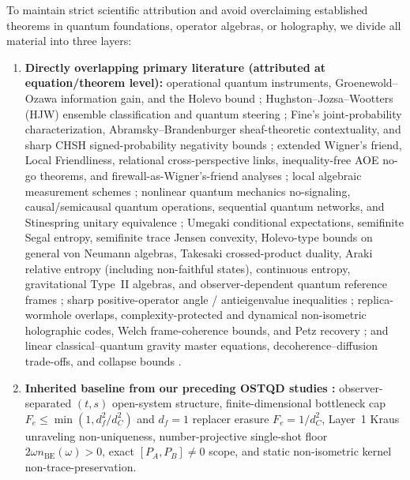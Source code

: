 \documentclass[11pt,a4paper]{article}
\theoremstyle{definition}
\theoremstyle{remark}
\newcommand{\1}{\mathbf{1}}
\begin{document}
To maintain strict scientific attribution and avoid overclaiming established theorems in quantum foundations, operator algebras, or holography, we divide all material into three layers:
\begin{enumerate}
  \item \textbf{Directly overlapping primary literature (attributed at equation/theorem level):} operational quantum instruments, Groenewold--Ozawa information gain, and the Holevo bound \cite{DaviesLewis1970,Groenewold1971,Holevo1973,Ozawa1984,Ozawa1986}; Hughston--Jozsa--Wootters (HJW) ensemble classification and quantum steering \cite{HJW1993,WisemanJonesDoherty2007}; Fine's joint-probability characterization, Abramsky--Brandenburger sheaf-theoretic contextuality, and sharp CHSH signed-probability negativity bounds \cite{Fine1982,AbramskyBrandenburger2011,Oas2014,Morris2022}; extended Wigner's friend, Local Friendliness, relational cross-perspective links, inequality-free AOE no-go theorems, and firewall-as-Wigner's-friend analyses \cite{FrauchigerRenner2018,Bong2020,AdlamRovelli2022,OrmrodBarrett2022,OrmrodVilasiniBarrett2023,HausmannRenner2025,Walleghem2025}; local algebraic measurement schemes \cite{FewsterVerch2020}; nonlinear quantum mechanics no-signaling, causal/semicausal quantum operations, sequential quantum networks, and Stinespring unitary equivalence \cite{Gisin1990,Polchinski1991,Beckman2001,Chiribella2009,Watrous2018}; Umegaki conditional expectations, semifinite Segal entropy, semifinite trace Jensen convexity, Holevo-type bounds on general von Neumann algebras, Takesaki crossed-product duality, Araki relative entropy (including non-faithful states), continuous entropy, gravitational Type~II algebras, and observer-dependent quantum reference frames \cite{Umegaki1954,Segal1960,Takesaki1973,Araki1976,Araki1977,HaradaKosaki2010,PodsedkowskaWieczorek2017,LongoWitten2023,Witten2022,CLPW2023,CPW2023,JensenSorceSperanza2023,DeVuyst2024,DeVuyst2025}; sharp positive-operator angle / antieigenvalue inequalities \cite{Kantorovich1948,Gustafson1968}; replica-wormhole overlaps, complexity-protected and dynamical non-isometric holographic codes, Welch frame-coherence bounds, and Petz recovery \cite{Welch1974,Petz1986,Schumacher1996,PSSY2022,DeWolfeHigginbotham2023,Akers2024}; and linear classical--quantum gravity master equations, decoherence--diffusion trade-offs, and collapse bounds \cite{Donadi2021,Oppenheim2023PRX,Oppenheim2023NatComm,DSW2023}.
  \item \textbf{Inherited baseline from our preceding OSTQD studies \cite{Soga2026OSTQD,Soga2026OSTQDSK}:} observer-separated $(t,s)$ open-system structure, finite-dimensional bottleneck cap $F_e\le\min(1,d_f^2/d_C^2)$ and $d_f=1$ replacer erasure $F_e=1/d_C^2$, Layer~1 Kraus unraveling non-uniqueness, number-projective single-shot floor $2\omega n_{\mathrm{BE}}(\omega)>0$, exact $[P_A,P_B]\neq 0$ scope, and static non-isometric kernel non-trace-preservation.

\end{enumerate}
\end{document}
